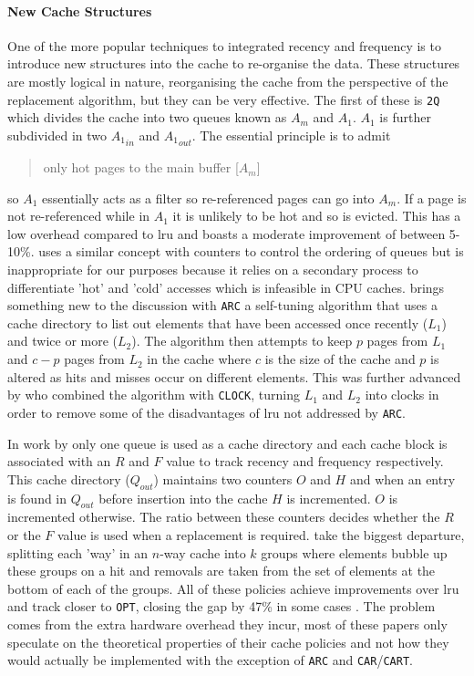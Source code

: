\paragraph{New Cache Structures}

One of the more popular techniques to integrated recency and frequency is to introduce new structures into the cache to re-organise the data. These structures are mostly logical in nature, reorganising the cache from the perspective of the replacement algorithm, but they can be very effective. The first of these is \texttt{2Q} \cite{johnson2QLowOverhead1994} which divides the cache into two queues known as $A_m$ and $A_1$. $A_1$ is further subdivided in two ${A_1}_{in}$ and ${A_1}_{out}$. The essential principle is to admit \blockcquote{johnson2QLowOverhead1994}{only hot pages to the main buffer [$A_m$]} so $A_1$ essentially acts as a filter so re-referenced pages can go into $A_m$. If a page is not re-referenced while in $A_1$ it is unlikely to be hot and so is evicted. This has a low overhead compared to \gls{lru} and boasts a moderate improvement of between 5-10\%. \citet{menaudImprovingEffectivenessWeb2000} uses a similar concept with counters to control the ordering of queues but is inappropriate for our purposes because it relies on a secondary process to differentiate 'hot' and 'cold' accesses which is infeasible in CPU caches.  \citet{megiddoARCSelfTuningLow2003} brings something new to the discussion with \texttt{ARC} a self-tuning algorithm that uses a cache directory to list out elements that have been accessed once recently ($L_1$) and twice or more  ($L_2$). The algorithm then attempts to keep $p$ pages from $L_1$ and $c-p$ pages from $L_2$ in the cache where $c$ is the size of the cache and $p$ is altered as hits and misses occur on different elements. This was further advanced by \citet{bansalCARClockAdaptive2004} who combined the algorithm with \texttt{CLOCK}, turning $L_1$ and $L_2$ into clocks in order to remove some of the disadvantages of \gls{lru} not addressed by \texttt{ARC}. 

In work by \citet{liCRFPNovelAdaptive2008} only one queue is used as a cache directory and each cache block is associated with an $R$ and $F$ value to track recency and frequency respectively. This cache directory ($Q_{out}$) maintains two counters $O$ and $H$ and when an entry is found in $Q_{out}$ before insertion into the cache $H$ is incremented. $O$ is incremented otherwise. The ratio between these counters decides whether the $R$ or the $F$ value is used when a replacement is required. \citet{zhangDivideandconquerBubbleReplacement2009} take the biggest departure, splitting each 'way' in an $n$-way cache into $k$ groups where elements bubble up these groups on a hit and removals are taken from the set of elements at the bottom of each of the groups. All of these policies achieve improvements over \gls{lru} and track closer to \texttt{OPT}, closing the gap by 47\% in some cases \cite{zhangDivideandconquerBubbleReplacement2009}. The problem comes from the extra hardware overhead they incur, most of these papers only speculate on the theoretical properties of their cache policies and not how they would actually be implemented with the exception of \texttt{ARC} and \texttt{CAR}/\texttt{CART}.

